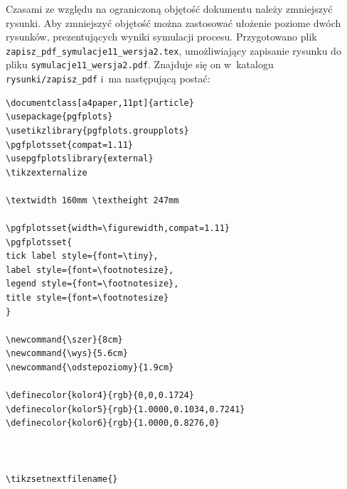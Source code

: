 Czasami ze względu na ograniczoną objętość dokumentu należy zmniejszyć rysunki. Aby zmniejszyć objętość można zastosować ułożenie poziome dwóch rysunków, prezentujących wyniki symulacji procesu. Przygotowano plik \verb+zapisz_pdf_symulacje11_wersja2.tex+, umożliwiający zapisanie rysunku do pliku \verb+symulacje11_wersja2.pdf+. Znajduje się on w~katalogu \verb+rysunki/zapisz_pdf+ i~ma następującą postać:
\begin{lstlisting}[style=customlatex,frame=single]
\documentclass[a4paper,11pt]{article}
\usepackage{pgfplots}
\usetikzlibrary{pgfplots.groupplots}
\pgfplotsset{compat=1.11}
\usepgfplotslibrary{external}
\tikzexternalize

\textwidth 160mm \textheight 247mm

\pgfplotsset{width=\figurewidth,compat=1.11}
\pgfplotsset{
tick label style={font=\tiny},
label style={font=\footnotesize},
legend style={font=\footnotesize},
title style={font=\footnotesize}
}

\newcommand{\szer}{8cm}
\newcommand{\wys}{5.6cm}
\newcommand{\odstepoziomy}{1.9cm}

\definecolor{kolor4}{rgb}{0,0,0.1724}
\definecolor{kolor5}{rgb}{1.0000,0.1034,0.7241}
\definecolor{kolor6}{rgb}{1.0000,0.8276,0}



\tikzsetnextfilename{}


\end{lstlisting}
